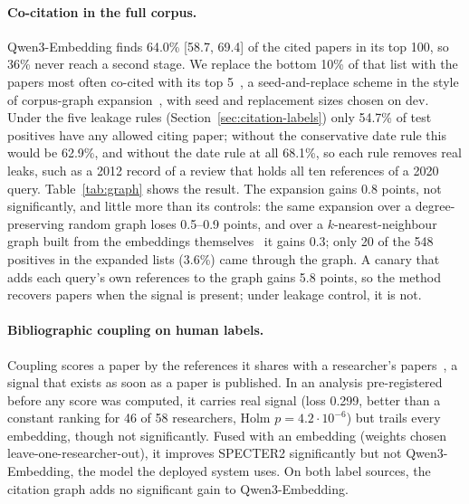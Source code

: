 \documentclass[sigconf,nonacm]{acmart}
\begin{document}
\paragraph{Co-citation in the full corpus.}
Qwen3-Embedding finds 64.0\% [58.7, 69.4] of the cited papers in its top 100, so 36\% never reach a second stage.
We replace the bottom 10\% of that list with the papers most often co-cited with its top 5~\citep{small1973cocitation}, a seed-and-replace scheme in the style of corpus-graph expansion~\citep{macavaney2022gar,kulkarni2025grit}, with seed and replacement sizes chosen on dev.
Under the five leakage rules (Section~\ref{sec:citation-labels}) only 54.7\% of test positives have any allowed citing paper; without the conservative date rule this would be 62.9\%, and without the date rule at all 68.1\%, so each rule removes real leaks, such as a 2012 record of a review that holds all ten references of a 2020 query.
Table~\ref{tab:graph} shows the result.
The expansion gains 0.8 points, not significantly, and little more than its controls: the same expansion over a degree-preserving random graph loses 0.5--0.9 points, and over a $k$-nearest-neighbour graph built from the embeddings themselves~\citep{kulkarni2023ladr} it gains 0.3; only 20 of the 548 positives in the expanded lists (3.6\%) came through the graph.
A canary that adds each query's own references to the graph gains 5.8 points, so the method recovers papers when the signal is present; under leakage control, it is not.

\paragraph{Bibliographic coupling on human labels.}
Coupling scores a paper by the references it shares with a researcher's papers~\citep{kessler1963coupling}, a signal that exists as soon as a paper is published.
In an analysis pre-registered before any score was computed, it carries real signal (loss 0.299, better than a constant ranking for 46 of 58 researchers, Holm $p = 4.2 \cdot 10^{-6}$) but trails every embedding, though not significantly.
Fused with an embedding (weights chosen leave-one-researcher-out), it improves SPECTER2 significantly but not Qwen3-Embedding, the model the deployed system uses.
On both label sources, the citation graph adds no significant gain to Qwen3-Embedding.
\end{document}
